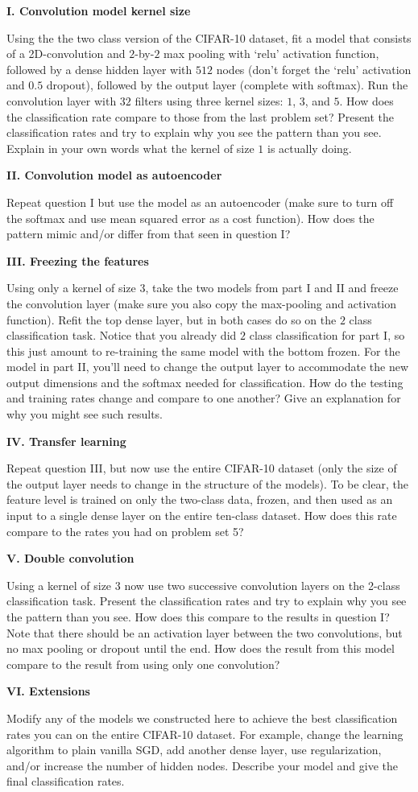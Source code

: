 \documentclass[12pt]{article}
\begin{document}
\textbf{I. Convolution model kernel size}

Using the the two class version of the CIFAR-10 dataset, fit a model that
consists of a 2D-convolution and $2$-by-$2$ max pooling with `relu' activation
function, followed by a dense hidden layer with $512$
nodes (don't forget the `relu' activation and $0.5$ dropout), followed by the
output layer (complete with softmax). Run the convolution layer with $32$
filters using three kernel sizes: $1$, $3$, and $5$. How does the classification rate compare to
those from the last problem set? Present the classification rates and try
to explain why you see the pattern than you see. Explain in your own words
what the kernel of size $1$ is actually doing.

\textbf{II. Convolution model as autoencoder}

Repeat question I but use the model as an autoencoder (make sure to turn
off the softmax and use mean squared error as a cost function).
How does the pattern mimic and/or differ from that seen in question I?

\textbf{III. Freezing the features}

Using only a kernel of size $3$, take the two models from part I and II
and freeze the convolution layer (make sure you also copy the max-pooling
and activation function). Refit the top dense layer, but in both
cases do so on the $2$ class classification task. Notice that you already
did $2$ class classification for part I, so this just amount to re-training
the same model with the bottom frozen. For the model in part II, you'll
need to change the output layer to accommodate the new output dimensions
and the softmax needed for classification.
How do the testing and training rates change and compare to one another?
Give an explanation for why you might see such results.

\textbf{IV. Transfer learning}

Repeat question III, but now use the entire CIFAR-10 dataset (only the size
of the output layer needs to change in the structure of the models). To be clear, the
feature level is trained on only the two-class data, frozen, and then used as
an input to a single dense layer on the entire ten-class dataset. How does
this rate compare to the rates you had on problem set 5?

\textbf{V. Double convolution}

Using a kernel of size $3$ now use two successive convolution layers on the
2-class classification task. Present the classification rates and try
to explain why you see the pattern than you see. How does this compare to
the results in question I? Note that there should be an activation layer between
the two convolutions, but no max pooling or dropout until the end. How does
the result from this model compare to the result from using only one convolution?

\textbf{VI. Extensions}

Modify any of the models we constructed here to achieve the best classification
rates you can on the entire CIFAR-10 dataset. For example, change the learning
algorithm to plain vanilla SGD, add another dense layer, use regularization,
and/or increase the number of hidden nodes. Describe your model and give the
final classification rates.
\end{document}
